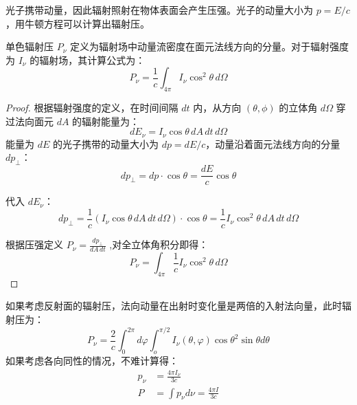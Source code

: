 光子携带动量，因此辐射照射在物体表面会产生压强。光子的动量大小为 $p = E/c$，用牛顿方程可以计算出辐射压。
\begin{theorem}[单色辐射压公式]
    单色辐射压 $P_\nu$ 定义为辐射场中动量流密度在面元法线方向的分量。对于辐射强度为 $I_\nu$ 的辐射场，其计算公式为：
    \begin{equation}
        P_\nu = \frac{1}{c} \int_{4\pi} I_\nu \cos^2\theta \, d\Omega
    \end{equation}
\end{theorem}

\begin{proof}
    根据辐射强度的定义，在时间间隔 $dt$ 内，从方向 $(\theta, \phi)$ 的立体角 $d\Omega$ 穿过法向面元 $dA$ 的辐射能量为：
    \begin{equation*}
        dE_\nu = I_\nu \cos\theta \, dA \, dt \, d\Omega
    \end{equation*}
    能量为 $dE$ 的光子携带的动量大小为 $dp = dE/c$，动量沿着面元法线方向的分量 $dp_{\perp}$：
    \begin{equation*}
        dp_{\perp} = dp \cdot \cos\theta = \frac{dE}{c} \cos\theta
    \end{equation*}
    
    
    代入 $dE_\nu$：
    \begin{equation*}
        dp_{\perp} = \frac{1}{c} (I_\nu \cos\theta \, dA \, dt \, d\Omega) \cdot \cos\theta = \frac{1}{c} I_\nu \cos^2\theta \, dA \, dt \, d\Omega
    \end{equation*}
    
    根据压强定义 $P_\nu = \frac{dp_{\perp}}{dA \, dt}$ ,对全立体角积分即得：
    \begin{equation*}
        P_\nu = \int_{4\pi} \frac{1}{c} I_\nu \cos^2\theta \, d\Omega
    \end{equation*}
\end{proof}
如果考虑反射面的辐射压，法向动量在出射时变化量是两倍的入射法向量，此时辐射压为：
\begin{equation}
    P_\nu = \frac{2}{c}\int_0^{2\pi}d\varphi \int_o^{\pi/2}I_\nu(\theta, \varphi) \cos{\theta}^2\sin{\theta}d\theta
\end{equation}
如果考虑各向同性的情况，不难计算得：
\begin{align}
    p_\nu &= \frac{4\pi I_\nu}{3c} \\
    P &= \int p_\nu d\nu = \frac{4\pi I}{3c}
\end{align}

